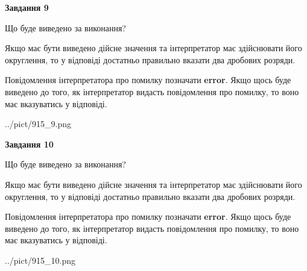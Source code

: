 \documentclass[12pt, ukrainian]{article}
\begin{document}
{\begin {Large}
{\begin {center}\textbf{Завдання 9}\end {center}}\par
Що буде виведено за виконання? \par

Якщо має бути виведено дійсне значення та інтерпретатор має здійснювати його округлення, 
то у відповіді достатньо правильно вказати два дробових розряди.

Повідомлення інтерпретатора про помилку позначати \textbf{error}.
Якщо щось буде виведено до того, як інтерпретатор видасть повідомлення про помилку, 
то воно має вказуватись у відповіді. \par

\begin{center}
	{../pict/915_9.png}
\end{center}
\newpage

{\begin {center}\textbf{Завдання 10}\end {center}}\par
Що буде виведено за виконання? \par

Якщо має бути виведено дійсне значення та інтерпретатор має здійснювати його округлення, 
то у відповіді достатньо правильно вказати два дробових розряди.

Повідомлення інтерпретатора про помилку позначати \textbf{error}.
Якщо щось буде виведено до того, як інтерпретатор видасть повідомлення про помилку, 
то воно має вказуватись у відповіді. \par

\begin{center}
	{../pict/915_10.png}
\end{center}
\newpage

\end {Large}}
\end{document}
